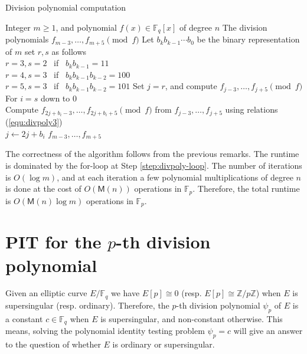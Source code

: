\documentclass[12pt]{article}
\theoremstyle{plain}
\theoremstyle{definition}
\def\Z{\ensuremath{\mathbb{Z}}}
\def\F{\ensuremath{\mathbb{F}}}
\def\MM{\ensuremath{\mathsf{M}}}
\begin{document}
\begin{algorithm}[H]
	\caption{Division polynomial computation}
	\label{alg:divpoly-comp}
	\begin{algorithmic}[1]
		\REQUIRE Integer $m \ge 1$, and polynomial $f(x) \in \F_q[x]$ of degree $n$
		\ENSURE The division polynomials $f_{m - 3}, \dots, f_{m + 5} \pmod{f}$
		\STATE Let $b_kb_{k - 1} \cdots b_0$ be the binary representation of $m$
		\STATE set $r, s$ as follows \\
		$r = 3, s = 2$~ if~ $b_kb_{k - 1} = 11$ \\
		$r = 4, s = 3$~ if~ $b_kb_{k - 1}b_{k - 2} = 100$ \\
		$r = 5, s = 3$~ if~ $b_kb_{k - 1}b_{k - 2} = 101$
		\STATE Set $j = r$, and compute $f_{j - 3}, \dots, f_{j + 5} \pmod{f}$
		\STATE\label{step:divpoly-loop} For $i = s$ down to $0$ \\
		Compute $f_{2j + b_i - 3}, \dots, f_{2j + b_i + 5} \pmod{f}$ from $f_{j - 3}, \dots, f_{j + 
		5}$ using relations (\ref{equ:divpoly3}) \\
		$j \leftarrow 2j + b_i$
		\RETURN $f_{m - 3}, \dots, f_{m + 5}$
	\end{algorithmic}
\end{algorithm}

The correctness of the algorithm follows from the previous remarks. The runtime is dominated by 
the for-loop at Step \ref{step:divpoly-loop}. The number of iterations is $O(\log m)$, and at each 
iteration a few polynomial multiplications of degree $n$ is done at the cost of $O(\MM(n))$ 
operations in $\F_p$. Therefore, the total runtime is $O(\MM(n)\log m)$ operations in $\F_p$.




\section{PIT for the $p$-th division polynomial}
\label{sec:pit-for-div}

Given an elliptic curve $E/\F_q$ we have $E[p] \cong 0$ (resp. $E[p] \cong \Z / p\Z$) when $E$ is 
supersingular (resp. ordinary). Therefore, the $p$-th division polynomial $\psi_p$ of $E$ is a 
constant $c \in \F_q$ when $E$ is supersingular, and non-constant otherwise. This means, solving 
the polynomial identity testing problem $\psi_p = c$ will give an answer to the question of whether 
$E$ is ordinary or supersingular. 
\end{document}
